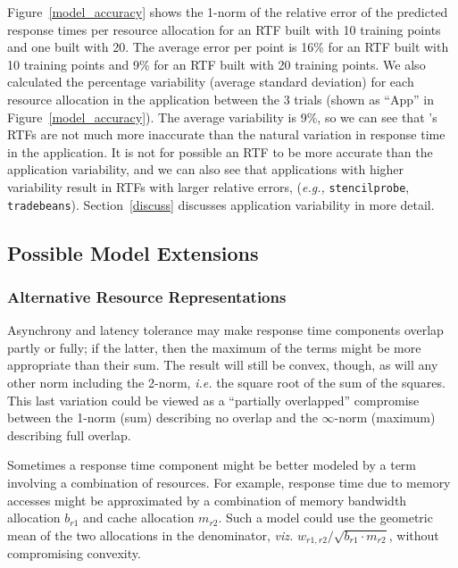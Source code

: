 Figure~\ref{model_accuracy} shows the 1-norm of the relative error of the predicted response times per resource allocation for an RTF built with 10 training points and one built with 20.  The average error per point is 16\% for an RTF built with 10 training points and 9\% for an RTF built with 20 training points.  We also calculated the percentage variability (average standard deviation) for each resource allocation in the application between the 3 trials (shown as ``App'' in Figure~\ref{model_accuracy}).  The average variability is 9\%, so we can see that \pacora's RTFs are not much more inaccurate than the natural variation in response time in the application.  It is not for possible an RTF to be more accurate than the application variability, and we can also see that applications with higher variability result in RTFs with larger relative errors, (\emph{e.g.,} \texttt{stencilprobe}, \texttt{ tradebeans}).  Section~\ref{discuss} discusses application variability in more detail.

\subsection{Possible Model Extensions}
\subsubsection{Alternative Resource Representations}
Asynchrony and latency tolerance may make response time components overlap partly or fully;
if the latter, then the maximum of the terms might be more appropriate than their sum.
The result will still be convex, though, as will any other norm including the 2-norm,
\emph{i.e.} the square root of the sum of the squares.
This last variation could be viewed as a ``partially overlapped'' compromise between
the 1-norm (sum) describing no overlap and the $\infty$-norm (maximum) describing full overlap.

Sometimes a response time component might be better modeled by a term involving a combination of resources.
For example, response time due to memory accesses might be approximated
by a combination of memory bandwidth allocation $b_{r1}$ and cache allocation $m_{r2}$.
Such a model could use the geometric mean of the two allocations in the denominator,
\emph{viz.} $w_{r1,r2}/\sqrt{b_{r1}\cdot m_{r2}}$, without compromising convexity.

